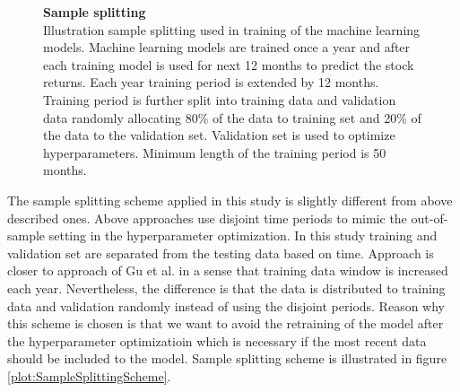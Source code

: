 \documentclass{article}
\begin{document}
\begin{figure}[h]
\centering
\label{plot:SampleSplittingScheme}
\caption[Sample splitting scheme]{\textbf{Sample splitting}\\ Illustration sample splitting used in training of the machine learning models. Machine learning models are trained once a year and after each training model is used for next 12 months to predict the stock returns. Each year training period is extended by 12 months. Training period is further split into training data and validation data randomly allocating 80\% of the data to training set and 20\% of the data to the validation set. Validation set is used to optimize hyperparameters. Minimum length of the training period is 50 months.}
\label{plot:Turnover}
\end{figure}

The sample splitting scheme applied in this study is slightly different from above described ones. Above approaches use disjoint time periods to mimic the out-of-sample setting in the hyperparameter optimization. In this study training and validation set are separated from the testing data based on time. Approach is closer to approach of Gu et al. \citeyear{guetal} in a sense that training data window is increased each year. Nevertheless, the difference is that the data is distributed to training data and validation randomly instead of using the disjoint periods. Reason why this scheme is chosen is that we want to avoid the retraining of the model after the hyperparameter optimizatioin which is necessary if the most recent data should be included to the model. Sample splitting scheme is illustrated in figure \ref{plot:SampleSplittingScheme}.
\end{document}
